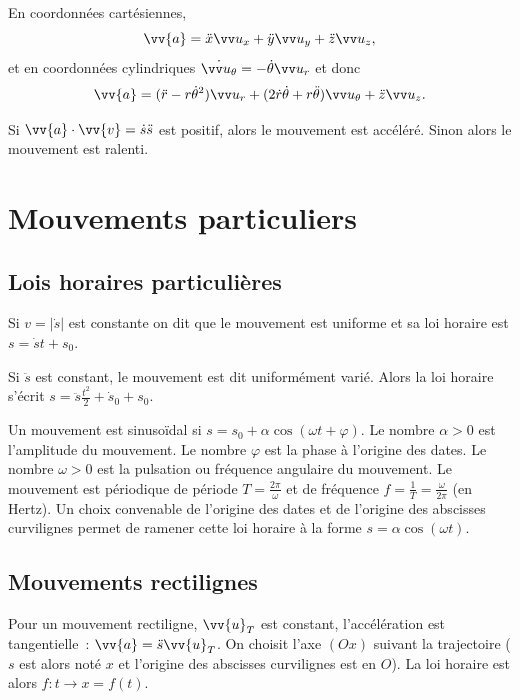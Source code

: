 En coordonnées cartésiennes,
\begin{equation}
  \vv{a} = \ddot{x}\ux+\ddot{y}\uy+\ddot{z}\uz,
\end{equation}
et en coordonnées cylindriques $\dot{\utheta}=-\dot{\theta}\ur$ et donc
\begin{equation}
  \vv{a}=(\ddot{r}-r\dot{\theta}^2)\ur+(2\dot{r}\dot{\theta}+r\ddot{\theta})\utheta+\ddot{z}\uz.
\end{equation}

Si $\vv{a}\cdot\vv{v}=\dot{s}\ddot{s}$ est positif, alors le mouvement est accéléré. Sinon alors le mouvement est ralenti.

\section{Mouvements particuliers}
\label{chap1-sec:mvtparticuliers}

\subsection{Lois horaires particulières}
\label{chap1-sec:loishorairespart}

Si $v=|\dot{s}|$ est constante on dit que le mouvement est uniforme et sa loi horaire est $s=\dot{s}t+s_0$.

Si $\ddot{s}$ est constant, le mouvement est dit uniformément varié. Alors la loi horaire s'écrit $s=\ddot{s} \frac{t^2}{2}+\dot{s}_0 +s_0$.

Un mouvement est sinusoïdal si $s=s_0+\alpha \cos(\omega t+\varphi)$. Le nombre $\alpha>0$ est l'amplitude du mouvement. Le nombre $\varphi$ est la phase à l'origine des dates. Le nombre $\omega>0$ est la pulsation ou fréquence angulaire du mouvement. Le mouvement est périodique de période $T=\frac{2\pi}{\omega}$ et de fréquence $f=\frac{1}{T}=\frac{\omega}{2\pi}$ (en Hertz). Un choix convenable de l'origine des dates et de l'origine des abscisses curvilignes permet de ramener cette loi horaire à la forme  $s = \alpha\cos(\omega t)$.

\subsection{Mouvements rectilignes}
\label{chap1-sec:mvtrect}

Pour un mouvement rectiligne, $\vv{u}_T$ est constant, l'accélération est tangentielle~: $\vv{a}=\ddot{s} \vv{u}_T$. On choisit l'axe $(Ox)$ suivant la trajectoire ($s$ est alors noté $x$ et l'origine des abscisses curvilignes est en $O$). La loi horaire est alors $f:t \rightarrow x=f(t)$.

